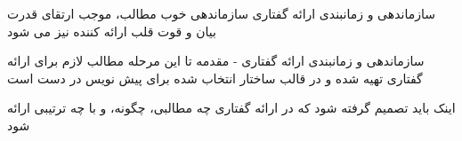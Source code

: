 \documentclass[14pt]{beamer}
\newcommand{\framefontsizelarge}{\fontsize{18pt}{0pt}\selectfont}
\newcommand{\frametitlefontsize}{\fontsize{20pt}{0pt}\selectfont}
\begin{document}
\begin{persian}
\begin{frame}[plain]{\frametitlefontsize سازماندهی و زمانبندی ارائه گفتاری}
		سازماندهی خوب مطالب، موجب ارتقای قدرت بیان و قوت قلب ارائه کننده نیز می شود
	\end{frame}	
	
	\begin{frame}[plain]{\frametitlefontsize سازماندهی و زمانبندی ارائه گفتاری - مقدمه}
		\framefontsizelarge
		تا این مرحله مطالب لازم برای ارائه گفتاری تهیه شده و در قالب ساختار انتخاب شده برای پیش نویس در دست است
		
		اینک باید تصمیم گرفته شود که در ارائه گفتاری چه مطالبی، چگونه، و با چه ترتیبی ارائه شود
		
		
	\end{frame}	

\end{persian}
\end{document}
